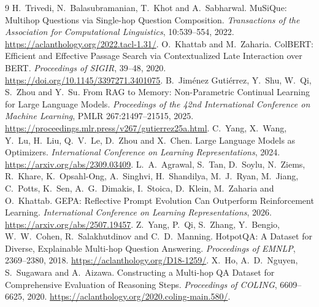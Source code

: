 \documentclass[12pt,a4paper]{report}
\begin{document}
\setcounter{chapter}{3}


\begin{thebibliography}{9}
H.~Trivedi, N.~Balasubramanian, T.~Khot and A.~Sabharwal.
MuSiQue: Multihop Questions via Single-hop Question Composition.
\emph{Transactions of the Association for Computational Linguistics},
10:539--554, 2022.
\url{https://aclanthology.org/2022.tacl-1.31/}.
O.~Khattab and M.~Zaharia.
ColBERT: Efficient and Effective Passage Search via Contextualized Late Interaction over BERT.
\emph{Proceedings of SIGIR}, 39--48, 2020.
\url{https://doi.org/10.1145/3397271.3401075}.
B.~Jim\'enez Guti\'errez, Y.~Shu, W.~Qi, S.~Zhou and Y.~Su.
From RAG to Memory: Non-Parametric Continual Learning for Large Language Models.
\emph{Proceedings of the 42nd International Conference on Machine Learning},
PMLR 267:21497--21515, 2025.
\url{https://proceedings.mlr.press/v267/gutierrez25a.html}.
C.~Yang, X.~Wang, Y.~Lu, H.~Liu, Q.~V.~Le, D.~Zhou and X.~Chen.
Large Language Models as Optimizers.
\emph{International Conference on Learning Representations}, 2024.
\url{https://arxiv.org/abs/2309.03409}.
L.~A.~Agrawal, S.~Tan, D.~Soylu, N.~Ziems, R.~Khare, K.~Opsahl-Ong,
A.~Singhvi, H.~Shandilya, M.~J.~Ryan, M.~Jiang, C.~Potts, K.~Sen,
A.~G.~Dimakis, I.~Stoica, D.~Klein, M.~Zaharia and O.~Khattab.
GEPA: Reflective Prompt Evolution Can Outperform Reinforcement Learning.
\emph{International Conference on Learning Representations}, 2026.
\url{https://arxiv.org/abs/2507.19457}.
Z.~Yang, P.~Qi, S.~Zhang, Y.~Bengio, W.~W.~Cohen, R.~Salakhutdinov
and C.~D.~Manning.
HotpotQA: A Dataset for Diverse, Explainable Multi-hop Question Answering.
\emph{Proceedings of EMNLP}, 2369--2380, 2018.
\url{https://aclanthology.org/D18-1259/}.
X.~Ho, A.~D.~Nguyen, S.~Sugawara and A.~Aizawa.
Constructing a Multi-hop QA Dataset for Comprehensive Evaluation of Reasoning Steps.
\emph{Proceedings of COLING}, 6609--6625, 2020.
\url{https://aclanthology.org/2020.coling-main.580/}.
\end{thebibliography}
\end{document}
